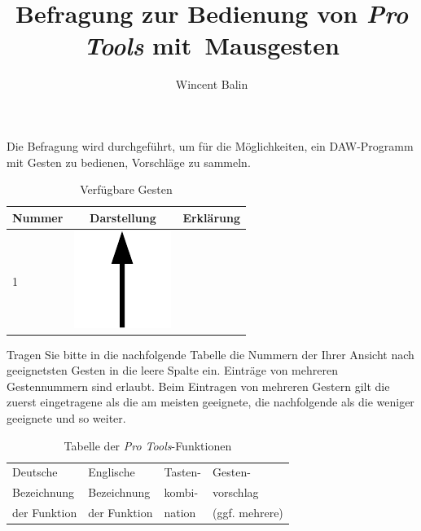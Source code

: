 \documentclass[11pt,a4paper,notitlepage]{article}
\author{Wincent Balin}
\title{Befragung zur Bedienung von \emph{Pro Tools} mit~Mausgesten}
\begin{document}
\maketitle

Die Befragung wird durchgeführt, um für die Möglichkeiten, ein DAW-Programm mit Gesten zu bedienen, Vorschläge zu sammeln.

\begin{table}[ht] \label{tab:Gestures}
\centering
\begin{tabular}{lcl} \toprule
Nummer & Darstellung & Erklärung \\ \midrule \midrule
 1 & \includegraphics[scale=0.25]{img/up} & \\ \midrule
\end{tabular}
\caption{Verfügbare Gesten}
\end{table}

Tragen Sie bitte in die nachfolgende Tabelle die Nummern der Ihrer Ansicht nach geeignetsten Gesten
in die leere Spalte ein. Einträge von mehreren Gestennummern sind erlaubt. Beim Eintragen von mehreren
Gestern gilt die zuerst eingetragene als die am meisten geeignete, die nachfolgende als die weniger geeignete
und so weiter.

\begin{table}[ht] \label{tab:Functions}
\centering
\begin{tabular}{llll} \toprule
Deutsche     & Englische    & Tasten- & Gesten-        \\
Bezeichnung  & Bezeichnung  & kombi-  & vorschlag      \\
der Funktion & der Funktion & nation  & (ggf. mehrere) \\ \midrule \midrule
\end{tabular}
\caption{Tabelle der \emph{Pro Tools}-Funktionen}
\end{table}
\end{document}
